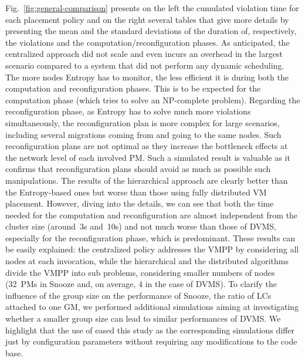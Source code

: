 Fig.~\ref{fig:general-comparison} presents on the left the cumulated
violation time for each placement policy and on the right several
tables that give more details by presenting the mean and the standard
deviations of the duration of, respectively, the violations and the
computation/reconfiguration phases. As anticipated, the centralized
approach did not scale and even incurs an overhead in the largest
scenario compared to a system that did not perform any dynamic
scheduling. The more nodes Entropy has to monitor, the less efficient
it is during both the computation and reconfiguration phases.
This is to be expected for the computation phase (which tries to solve
an NP-complete problem).  Regarding the reconfiguration phase, as
Entropy has to solve much more violations simultaneously, the
reconfiguration plan is more complex for large scenarios, including
several migrations coming from and going to the same nodes. Such
reconfiguration plans are not optimal as they increase the bottleneck
effects at the network level of each involved PM. Such a simulated
result is valuable as it confirms that reconfiguration plans should
avoid as much as possible such manipulations.
%
The results of the hierarchical approach are clearly better than the
Entropy-based ones but worse than those using fully distributed VM
placement. However, diving into the details, we can see that both the
time needed for the computation and reconfiguration are almost
independent from the cluster size (around~3s and~10s) and not much
worse than those of DVMS, especially for the reconfiguration phase,
which is predominant. These results can be easily explained: the
centralized policy addresses the VMPP by considering all nodes at each
invocation, while the hierarchical and the distributed algorithms
divide the VMPP into sub problems, considering smaller numbers of
nodes (32~PMs in Snooze and, on average, 4 in the case of DVMS). To
clarify the influence of the group size on the performance of Snooze,
\ie the ratio of LCs attached to one GM, we performed additional
simulations aiming at investigating whether a smaller group size can
lead to similar performances of DVMS. We highlight that the use of
\vmps eased this study as the corresponding simulations differ just by
configuration parameters without requiring any modifications to the
code base.


